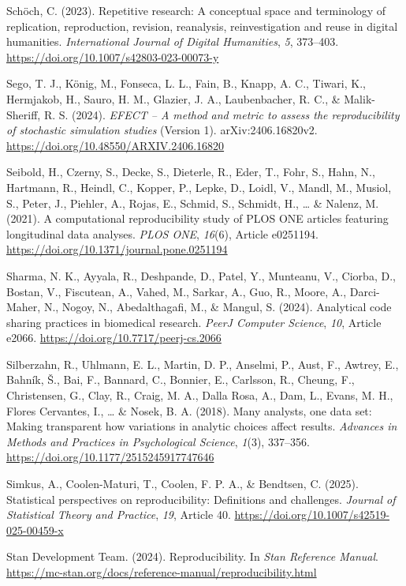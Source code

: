 \documentclass[authordate, meta]{jote-new-article}
\begin{document}
	Schöch, C. (2023). Repetitive research: A conceptual space and terminology of replication, reproduction, revision, reanalysis, reinvestigation and reuse in digital humanities. \emph{International Journal of Digital Humanities}, \emph{5}, 373--403. \url{https://doi.org/10.1007/s42803-023-00073-y}


	Sego, T. J., König, M., Fonseca, L. L., Fain, B., Knapp, A. C., Tiwari, K., Hermjakob, H., Sauro, H. M., Glazier, J. A., Laubenbacher, R. C., \& Malik-Sheriff, R. S. (2024). \emph{EFECT -- A method and metric to assess the reproducibility of stochastic simulation studies} (Version 1). arXiv:2406.16820v2. \url{https://doi.org/10.48550/ARXIV.2406.16820}


	Seibold, H., Czerny, S., Decke, S., Dieterle, R., Eder, T., Fohr, S., Hahn, N., Hartmann, R., Heindl, C., Kopper, P., Lepke, D., Loidl, V., Mandl, M., Musiol, S., Peter, J., Piehler, A., Rojas, E., Schmid, S., Schmidt, H., … \& Nalenz, M. (2021). A computational reproducibility study of PLOS ONE articles featuring longitudinal data analyses. \emph{PLOS ONE}, \emph{16}(6), Article e0251194. \url{https://doi.org/10.1371/journal.pone.0251194}


	Sharma, N. K., Ayyala, R., Deshpande, D., Patel, Y., Munteanu, V., Ciorba, D., Bostan, V., Fiscutean, A., Vahed, M., Sarkar, A., Guo, R., Moore, A., Darci-Maher, N., Nogoy, N., Abedalthagafi, M., \& Mangul, S. (2024). Analytical code sharing practices in biomedical research. \emph{PeerJ Computer Science}, \emph{10}, Article e2066. \url{https://doi.org/10.7717/peerj-cs.2066}


	Silberzahn, R., Uhlmann, E. L., Martin, D. P., Anselmi, P., Aust, F., Awtrey, E., Bahník, Š., Bai, F., Bannard, C., Bonnier, E., Carlsson, R., Cheung, F., Christensen, G., Clay, R., Craig, M. A., Dalla Rosa, A., Dam, L., Evans, M. H., Flores Cervantes, I., … \& Nosek, B. A. (2018). Many analysts, one data set: Making transparent how variations in analytic choices affect results. \emph{Advances in Methods and Practices in Psychological Science}, \emph{1}(3), 337--356. \url{https://doi.org/10.1177/2515245917747646}


	Simkus, A., Coolen-Maturi, T., Coolen, F. P. A., \& Bendtsen, C. (2025). Statistical perspectives on reproducibility: Definitions and challenges. \emph{Journal of Statistical Theory and Practice}, \emph{19}, Article 40. \url{https://doi.org/10.1007/s42519-025-00459-x}


	Stan Development Team. (2024). Reproducibility. In \emph{Stan Reference Manual}. \url{https://mc-stan.org/docs/reference-manual/reproducibility.html}
\end{document}
